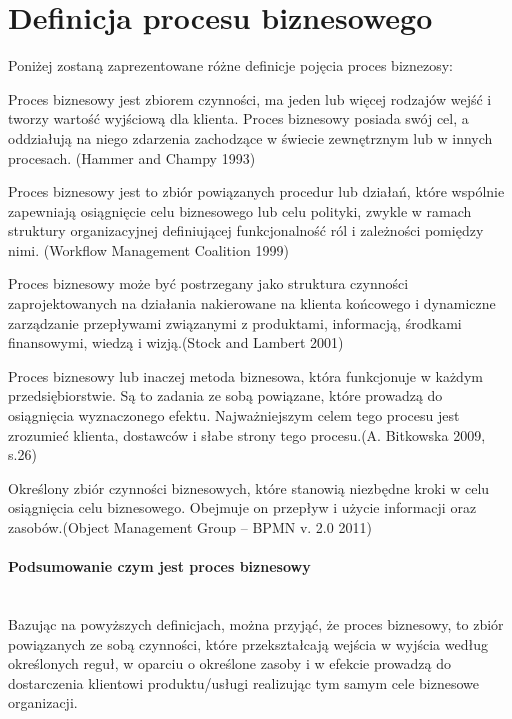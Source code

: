 \documentclass[a4paper, 12pt]{article}
\begin{document}
\section{Definicja procesu biznesowego}
\hspace*{1 cm}Poniżej zostaną zaprezentowane różne definicje pojęcia proces biznezosy:

\hspace*{1 cm}Proces biznesowy jest zbiorem czynności, ma jeden lub więcej rodzajów wejść i tworzy wartość wyjściową dla klienta. Proces biznesowy posiada swój cel, a oddziałują na niego zdarzenia zachodzące w świecie zewnętrznym lub w innych procesach.
(Hammer and Champy 1993)

\hspace*{1 cm} Proces biznesowy jest to zbiór powiązanych procedur lub działań, które wspólnie zapewniają osiągnięcie celu biznesowego lub celu polityki, zwykle w ramach struktury organizacyjnej definiującej funkcjonalność ról i zależności pomiędzy nimi. (Workflow Management Coalition 1999) 

\hspace*{1 cm}Proces biznesowy może być postrzegany jako struktura czynności zaprojektowanych na działania nakierowane na klienta końcowego i dynamiczne zarządzanie przepływami związanymi z produktami, informacją, środkami finansowymi, wiedzą i wizją.(Stock and Lambert 2001)        

\hspace*{1 cm}Proces biznesowy lub inaczej metoda biznesowa, która funkcjonuje w każdym przedsiębiorstwie. Są to zadania ze sobą powiązane, które prowadzą do osiągnięcia wyznaczonego efektu. Najważniejszym celem tego procesu jest zrozumieć klienta, dostawców i słabe strony tego procesu.(A. Bitkowska 2009, s.26)

\hspace*{1 cm}Określony zbiór czynności biznesowych, które stanowią niezbędne kroki w celu osiągnięcia celu biznesowego. Obejmuje on przepływ i użycie informacji oraz zasobów.(Object Management Group – BPMN v. 2.0 2011) 
\paragraph{Podsumowanie czym jest proces biznesowy}\mbox{}\\
\hspace*{1 cm} Bazując na powyższych definicjach, można przyjąć, że proces biznesowy, to zbiór powiązanych ze sobą czynności, które przekształcają wejścia w wyjścia według określonych reguł, w oparciu o określone zasoby i w efekcie prowadzą do dostarczenia klientowi produktu/usługi realizując tym samym cele biznesowe organizacji.
\end{document}
